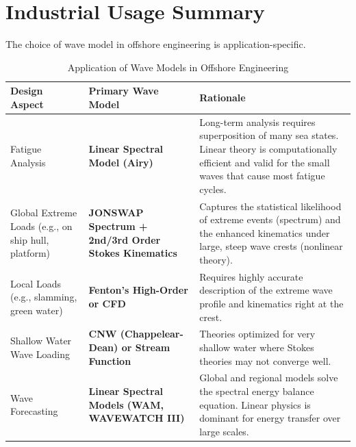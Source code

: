 \documentclass[11pt,letterpaper]{article}
\begin{document}
    \section{Industrial Usage Summary}
    The choice of wave model in offshore engineering is application-specific.
    \begin{table}[H]
        \centering
        \caption{Application of Wave Models in Offshore Engineering}
        \begin{tabular}{@{}p{3cm}p{7cm}p{3cm}@{}}
            \toprule
            Design Aspect & Primary Wave Model & Rationale \\
            \midrule
            Fatigue Analysis & \textbf{Linear Spectral Model (Airy)} & Long-term analysis requires superposition of many sea states. Linear theory is computationally efficient and valid for the small waves that cause most fatigue cycles. \\
            Global Extreme Loads (e.g., on ship hull, platform) & \textbf{JONSWAP Spectrum + 2nd/3rd Order Stokes Kinematics} & Captures the statistical likelihood of extreme events (spectrum) and the enhanced kinematics under large, steep wave crests (nonlinear theory). \\
            Local Loads (e.g., slamming, green water) & \textbf{Fenton's High-Order or CFD} & Requires highly accurate description of the extreme wave profile and kinematics right at the crest. \\
            Shallow Water Wave Loading & \textbf{CNW (Chappelear-Dean) or Stream Function} & Theories optimized for very shallow water where Stokes theories may not converge well. \\
            Wave Forecasting & \textbf{Linear Spectral Models (WAM, WAVEWATCH III)} & Global and regional models solve the spectral energy balance equation. Linear physics is dominant for energy transfer over large scales. \\
            \bottomrule
        \end{tabular}
    \end{table}
\end{document}
